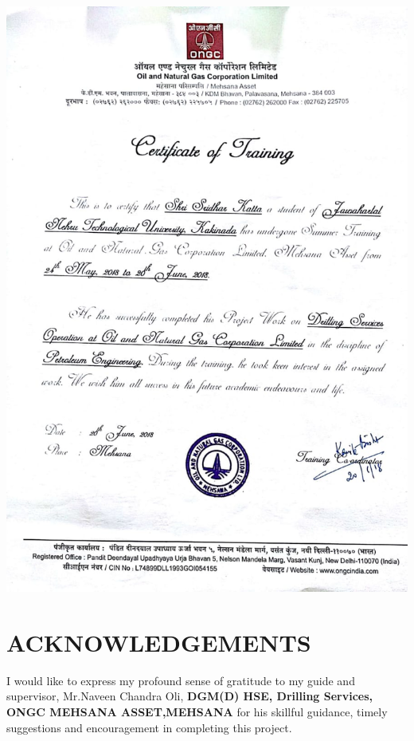 \documentclass[11pt,a4paper]{report}
\begin{document}
\includegraphics[scale=0.5]{images/Certificate}


%

\newpage


\section*{\centering ACKNOWLEDGEMENTS}

\doublespacing


\vspace{1em}

I would like to express my profound sense of gratitude to my guide and supervisor, Mr.Naveen Chandra Oli, \textbf{DGM(D) HSE, Drilling Services, ONGC MEHSANA ASSET,MEHSANA} for his skillful guidance, timely suggestions and encouragement in completing this project.
\end{document}

